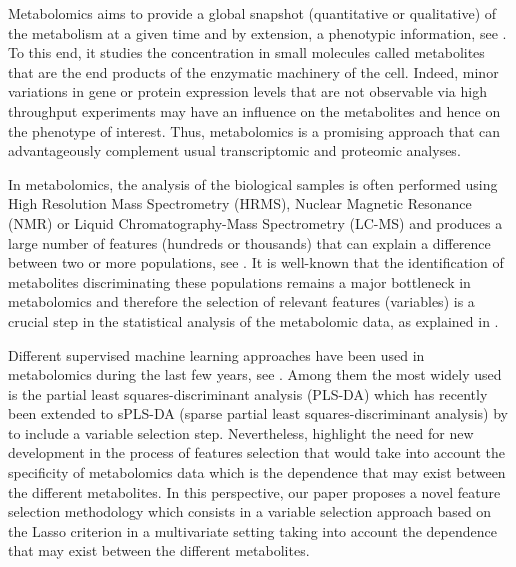 Metabolomics aims to provide a global snapshot (quantitative or
qualitative) of the metabolism at a given time and by extension, a
phenotypic information, see \cite{Nicholson1999}. 
To this end, it studies the concentration in small molecules called metabolites
that are the end products of the enzymatic machinery of the cell.
Indeed, minor variations in gene or protein expression levels that are
not observable via high throughput experiments may have an influence
on the metabolites and hence on the phenotype of interest. Thus,
metabolomics is a promising approach that can advantageously
complement usual transcriptomic and proteomic analyses.

In metabolomics, the analysis  of the biological samples is often performed
using High Resolution Mass Spectrometry (HRMS), Nuclear Magnetic Resonance (NMR)  or
Liquid  Chromatography-Mass Spectrometry  (LC-MS)   
and produces a large number of features (hundreds or thousands) 
that can explain a difference between two or more
populations, see \cite{Zhang2012}. It is well-known that the identification
of metabolites discriminating these populations remains a major bottleneck in metabolomics and therefore 
the selection of relevant features (variables) is a crucial step in the
statistical analysis of the metabolomic data, as explained in \cite{Verdegem2016}.

Different supervised machine learning approaches have been  used in
metabolomics during the last few years, see \cite{Saccenti2013,
  Ren2015, Boccard201618}. Among them the most widely used is 
the partial least squares-discriminant analysis (PLS-DA) which has recently been extended to sPLS-DA (sparse partial least squares-discriminant analysis)
by \cite{LeCao2011} to include a variable selection step. 
Nevertheless, \cite{Grissa2016}
 highlight the need for new development in the process of
 features selection that would take into account the specificity of
 metabolomics data which is the dependence that may exist between the
 different metabolites. In this perspective, our paper proposes a novel feature selection
 methodology which consists in a
 variable selection approach based on the Lasso criterion in a
 multivariate setting taking into account the dependence that may exist between the
 different metabolites.


